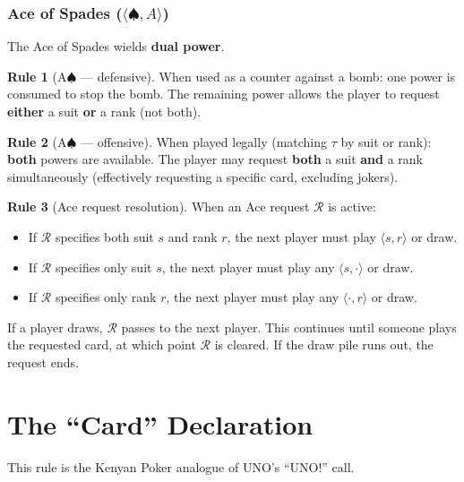 \documentclass[11pt,a4paper,twoside]{article}
\theoremstyle{definition}
\newtheorem{rule}{Rule}[section]
\theoremstyle{remark}
\newcommand{\Card}[2]{\ensuremath{\langle #1, #2 \rangle}}
\newcommand{\Top}{\ensuremath{\tau}}
\newcommand{\CardReq}{\ensuremath{\mathcal{R}}}
\begin{document}
\subsubsection{Ace of Spades ($\Card{\spadesuit}{A}$)}

The Ace of Spades wields \textbf{dual power}.

\begin{rule}[A$\spadesuit$ --- defensive]
  When used as a counter against a bomb: one power is consumed to stop the
  bomb. The remaining power allows the player to request \textbf{either} a
  suit \textbf{or} a rank (not both).
\end{rule}

\begin{rule}[A$\spadesuit$ --- offensive]
  When played legally (matching $\Top$ by suit or rank): \textbf{both} powers
  are available. The player may request \textbf{both} a suit \textbf{and} a
  rank simultaneously (effectively requesting a specific card, excluding
  jokers).
\end{rule}

\begin{rule}[Ace request resolution]
  When an Ace request $\CardReq$ is active:
  \begin{itemize}[nosep]
    \item If $\CardReq$ specifies both suit $s$ and rank $r$, the next player
          must play $\Card{s}{r}$ or draw.
    \item If $\CardReq$ specifies only suit $s$, the next player must play any
          $\Card{s}{\cdot}$ or draw.
    \item If $\CardReq$ specifies only rank $r$, the next player must play any
          $\Card{\cdot}{r}$ or draw.
  \end{itemize}
  If a player draws, $\CardReq$ passes to the next player. This continues
  until someone plays the requested card, at which point $\CardReq$ is
  cleared. If the draw pile runs out, the request ends.
\end{rule}

\section{The ``Card'' Declaration}
\label{sec:declare}

This rule is the Kenyan Poker analogue of UNO's ``UNO!'' call.
\end{document}
